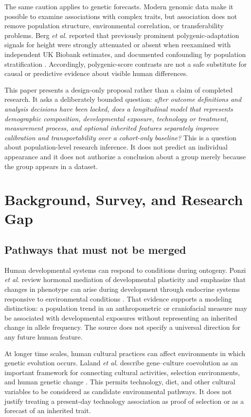 \documentclass[conference]{IEEEtran}
\begin{document}
The same caution applies to genetic forecasts. Modern genomic data make it
possible to examine associations with complex traits, but association does
not remove population structure, environmental correlation, or
transferability problems. Berg \emph{et al.} reported that previously
prominent polygenic-adaptation signals for height were strongly attenuated or
absent when reexamined with independent UK Biobank estimates, and documented
confounding by population stratification \cite{berg2019}. Accordingly,
polygenic-score contrasts are not a safe substitute for causal or predictive
evidence about visible human differences.

This paper presents a design-only proposal rather than a claim of completed
research. It asks a deliberately bounded question: \emph{after outcome
definitions and analysis decisions have been locked, does a longitudinal
model that represents demographic composition, developmental exposure,
technology or treatment, measurement process, and optional inherited features
separately improve calibration and transportability over a cohort-only
baseline?} This is a question about population-level research inference. It
does not predict an individual appearance and it does not authorize a
conclusion about a group merely because the group appears in a dataset.

\section{Background, Survey, and Research Gap}

\subsection{Pathways that must not be merged}

Human developmental systems can respond to conditions during ontogeny.
Ponzi \emph{et al.} review hormonal mediation of developmental plasticity and
emphasize that changes in phenotype can arise during development through
endocrine systems responsive to environmental conditions \cite{ponzi2020}.
That evidence supports a modeling distinction: a population trend in an
anthropometric or craniofacial measure may be associated with developmental
exposures without representing an inherited change in allele frequency. The
source does not specify a universal direction for any future human feature.

At longer time scales, human cultural practices can affect environments in
which genetic evolution occurs. Laland \emph{et al.} describe gene--culture
coevolution as an important framework for connecting cultural activities,
selection environments, and human genetic change \cite{laland2010}. This
permits technology, diet, and other cultural variables to be considered as
candidate environmental pathways. It does not justify treating a present-day
technology association as proof of selection or as a forecast of an inherited
trait.
\end{document}
